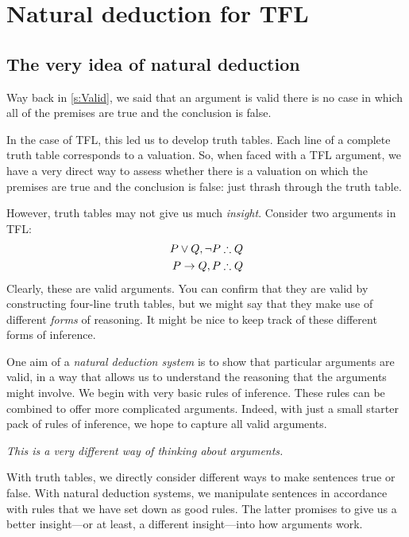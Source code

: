 \part{Natural deduction for TFL}
\label{ch.NDTFL}

\chapter{The very idea of natural deduction}\label{s:NDVeryIdea}

Way back in \cref{s:Valid}, we said that an argument is valid \ifeff{} there is no case in which all of the premises are true and the conclusion is false.

In the case of TFL, this led us to develop truth tables. Each line of a complete truth table corresponds to a valuation. So, when faced with a TFL argument, we have a very direct way to assess whether there is a valuation on which the premises are true and the conclusion is false: just thrash through the truth table.

However, truth tables may not give us much \emph{insight}. Consider two arguments in TFL:
\begin{align*}
P \eor Q, \enot P & \therefore Q\\
P \eif Q, P & \therefore Q
\end{align*}
Clearly, these are valid arguments. You can confirm that they are valid by constructing four-line truth tables, but we might say that they make use of different \emph{forms} of reasoning. It might be nice to keep track of these different forms of inference.

One aim of a \emph{natural deduction system} is to show that particular arguments are valid, in a way that allows us to understand the reasoning that the arguments might involve. We begin with very basic rules of inference. These rules can be combined to offer more complicated arguments. Indeed, with just a small starter pack of rules of inference, we hope to capture all valid arguments.

\emph{This is a very different way of thinking about arguments.} 

With truth tables, we directly consider different ways to make sentences true or false. With natural deduction systems, we manipulate sentences in accordance with rules that we have set down as good rules. The latter promises to give us a better insight---or at least, a different insight---into how arguments work.

